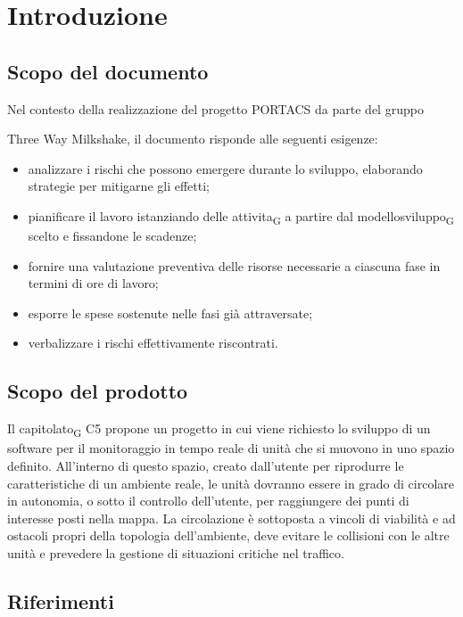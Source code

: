 \section{Introduzione}




\subsection{Scopo del documento}

Nel contesto della realizzazione del progetto PORTACS da parte del gruppo {Three Way Milkshake, il documento risponde alle seguenti esigenze: 
\begin{itemize}
	\item analizzare i rischi che possono emergere durante lo sviluppo, elaborando strategie per mitigarne gli effetti;
	\item pianificare il lavoro istanziando delle \gls{attivita}\textsubscript{G} a partire dal \gls{modellosviluppo}\textsubscript{G} scelto e fissandone le scadenze;
	\item fornire una valutazione preventiva delle risorse necessarie a ciascuna fase in termini di ore di lavoro;
	\item esporre le spese sostenute nelle fasi già attraversate;
	\item verbalizzare i rischi effettivamente riscontrati.
\end{itemize}



\subsection{Scopo del prodotto}

Il \gls{capitolato}\textsubscript{G} C5 propone un progetto in cui viene richiesto lo sviluppo di un software per il monitoraggio in tempo reale di unità che si muovono in uno spazio definito. All’interno di questo spazio, creato dall’utente per riprodurre le caratteristiche di un ambiente reale, le unità dovranno essere in grado di circolare in autonomia, o sotto il controllo dell’utente, per raggiungere dei punti di interesse posti nella mappa.  La circolazione è sottoposta a vincoli di viabilità e ad ostacoli propri della topologia dell’ambiente, deve evitare le collisioni con le altre unità e prevedere la gestione di situazioni critiche nel traffico.




\subsection{Riferimenti}



}
